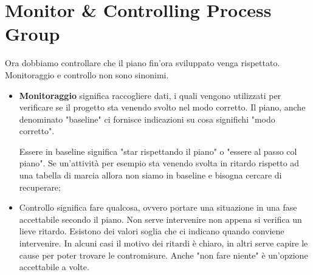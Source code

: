 \section{Monitor \& Controlling Process Group}
Ora dobbiamo controllare che il piano fin'ora sviluppato venga rispettato. Monitoraggio e controllo non sono sinonimi.
\begin{itemize}
	\item \textbf{Monitoraggio} significa raccogliere dati, i quali vengono utilizzati per verificare se il progetto sta venendo svolto nel modo corretto. Il piano, anche denominato "baseline" ci fornisce indicazioni su cosa significhi "modo corretto".
	\begin{info}
		Essere in baseline significa "star rispettando il piano" o "essere al passo col piano". Se un'attività per esempio sta venendo svolta in ritardo rispetto ad una tabella di marcia allora non siamo in baseline e bisogna cercare di recuperare;
	\end{info}
	\item Controllo significa fare qualcosa, ovvero portare una situazione in una fase accettabile secondo il piano. Non serve intervenire non appena si verifica un lieve ritardo. Esistono dei valori soglia che ci indicano quando conviene intervenire.  In alcuni casi il motivo dei ritardi è chiaro, in altri serve capire le cause per poter trovare le contromisure. Anche "non fare niente" è un'opzione accettabile a volte.
\end{itemize}

